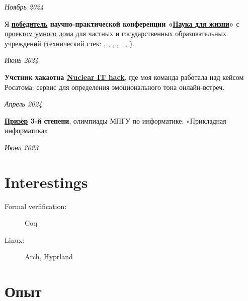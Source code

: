 \documentclass[margin,line]{resume}
\begin{document}
\begin{resume}
\vspace{-6mm}

\hfill \textsl{Ноябрь 2024}

Я
\textbf{\href{https://github.com/alchemmist/CV/blob/main/attachments/scince-for-life-win.pdf}{победитель}
  научно-практической конференции
  «\href{https://conf.profil.mos.ru/academ}{Наука для
жизни}»} с \href{https://github.com/smart-cab/}{проектом умного
дома} для частных и государственных
образовательных учреждений (технический стек: ,
  , , ,
, , ).
\vspace{-6mm}

\hfill \textsl{Июнь 2024}

\textbf{Учстник хакаотна \href{https://nuclearhack.mephi.ru/}{Nuclear
IT hack}}, где моя команда работала
над кейсом Росатома: сервис для определения эмоционального тона онлайн-встреч.

\vspace{-6mm}

\hfill \textsl{Апрель 2024}

\textbf{\href{https://github.com/alchemmist/CV/blob/main/attachments/informatics-olimpic.pdf}{Призёр}
3-й степени}, олимпиады МПГУ по информатике:
«Прикладная информатика»

\vspace{-3mm}

\hfill \textsl{Июнь 2023}

\section{\mysidestyle Interestings}\vspace{2mm}
\begin{description}
  \item[Formal verfification:] Coq
  \item[Linux:] Arch, Hyprland
\end{description}

\vfill

\section{\mysidestyle Опыт}\vspace{2mm}

\begin{description}


\end{description}
\end{resume}
\end{document}
